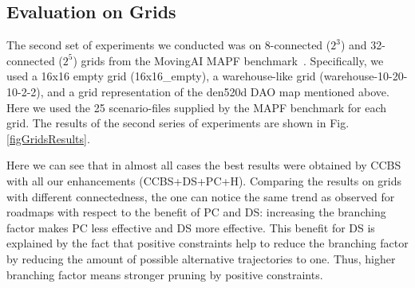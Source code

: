 \documentclass[letterpaper]{article} %
\newcommand{\ccbs}{\ac{CCBS}\xspace}
\newcommand{\mapf}{\ac{MAPF}\xspace}
\newcommand{\pc}{\ac{PC}\xspace}
\newcommand{\ds}{\ac{DS}\xspace}
\begin{document}
\subsection{Evaluation on Grids}

The second set of experiments we conducted was on 8-connected ($2^3$) and 32-connected ($2^5$) grids from the MovingAI \mapf benchmark~\cite{stern2019multi}. 
Specifically, we used a 16x16 empty grid (16x16\_empty), a warehouse-like grid (warehouse-10-20-10-2-2), and a grid representation of the den520d DAO map mentioned above. 
Here we used the 25 scenario-files supplied by the \mapf benchmark for each grid. 
The results of the second series of experiments are shown in Fig.\ref{figGridsResults}.


Here we can see that in almost all cases %
the best results were obtained by \ccbs with all our enhancements (\ccbs+\ds+\pc+H). 
Comparing the results on grids with different connectedness, the one can notice the same trend as observed for roadmaps with respect to the benefit of \pc and \ds: increasing the branching factor makes \pc less effective and \ds more effective. %
This benefit for \ds is explained by the fact that positive constraints help to reduce the branching factor by reducing the amount of possible alternative trajectories to one. Thus, higher branching factor means stronger pruning by positive constraints. 


\end{document}
